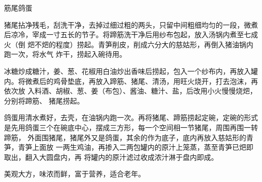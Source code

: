 \begin{recipe}[筋鞭鸽蛋]{筋尾鸽蛋}

\ingredients


\preparation

\step 猪尾拈净残毛，刮洗干净，去掉过细过粗的两头，只留中间粗细均匀的一段，微煮
后凉冷，宰成一寸五长的节子。将蹄筋洗干净后用纱布包起，放入汤锅内煮至七成火（倒
𤆵不𤆵的程度）捞起。青笋削皮，削成六分大的慈姑形，再倒入猪油锅内跑一次，将水气
炸干，捞起入碗待用。

\step 冰糖炒成糖汁，姜、葱、花椒用白油炒出香味后捞起，包入一个纱布内，再放入罐
内。将微煮后的鸡骨垫底，再放入蹄筋、猪尾、清汤，用旺火烧开，打去泡沫，再依次放
入料酒、胡椒、葱、姜（布包）、酱油、糖汁、盐，后改用小火慢慢烧𤆵，分别将蹄筋、
猪尾捞起。

\step 鸽蛋用清水煮好，去壳，在油锅内跑一次。再将猪尾、蹄筋捞起定碗，定碗的形式
是先用鸽蛋三个在碗底中心，摆成三方形，每一个空间相一节猪尾，周围再围一转蹄筋，
外面围猪尾，猪尾外又是鸽蛋，其余的作为底子，底内再放入慈姑形的青笋，青笋上面放
一两生鸡油，再掺入二两包罐内的原汁上笼蒸，蒸至青笋已𤆵即取出，翻入大圆盘内，再
将罐内的原汁滤过收成浓汁淋于盘内即成。

\features

美观大方，味浓而鲜，富于营养，适合老年。

\end{recipe}

